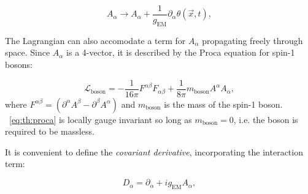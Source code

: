 \begin{equation}
\label{eq:th:photon_gauge}
A_{\alpha} \rightarrow A_{\alpha} + \frac{1}{g_{\textrm{EM}}} \partial_{\alpha} \theta(\vec{x},t),
\end{equation}


The Lagrangian can also accomodate a term for $A_{\alpha}$ propagating freely through space. Since $A_{\alpha}$ is a 4-vector, it is described by the Proca equation for spin-1 bosons:

\begin{equation}
\label{eq:th:proca}
\mathcal{L}_{\textrm{boson}} = -\frac{1}{16\pi} F^{\alpha\beta}F_{\alpha\beta} + \frac{1}{8\pi} m_{\textrm{boson}} A^{\alpha} A_{\alpha},
\end{equation}
where $F^{\alpha \beta} =(\partial^{\alpha} A^{\beta} - \partial^{\beta} A^{\alpha})$ and $m_{\textrm{boson}}$ is the mass of the spin-1 boson. 
\Eq~\ref{eq:th:proca} is locally gauge invariant so long as $m_{\textrm{boson}}=0$, i.e. the boson is required to be massless.


It is convenient to define the \emph{covariant derivative}, incorporating the interaction term:

\begin{equation}
\label{eq:th:covariant_derivative}
D_{\alpha} = \partial_{\alpha} + i g_{\textrm{EM}}A_{\alpha},
\end{equation}

